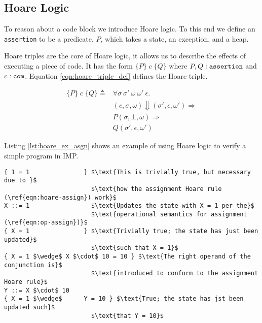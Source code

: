 
\subsection{Hoare Logic}
To reason about a code block we introduce Hoare logic. To this end we define an \verb|assertion| to be a predicate, $P$, which takes a state, an exception, and a heap.

Hoare triples are the core of Hoare logic, it allows us to describe the effects of executing a piece of code. It has the form $\{P\}\;c\;\{Q\}$ where $P,Q : \verb|assertion|$ and $c : \verb|com|$.
Equation \ref{eqn:hoare_triple_def} defines the Hoare triple.

\begin{equation}\label{eqn:hoare_triple_def}
\begin{alignedat}{1}
\{P\}\;c\;\{Q\} \triangleq &\forall \sigma \: \sigma' \: \omega \: \omega' \: \epsilon .\\
& (c,\sigma,\omega) \Downarrow (\sigma', \epsilon, \omega') \Rightarrow\\
& P(\sigma,\bot,\omega) \Rightarrow\\
& Q(\sigma',\epsilon,\omega')
\end{alignedat}
\end{equation}

Listing \ref{lst:hoare_ex_asgn} shows an example of using Hoare logic to verify a simple program in IMP.

\begin{lstlisting}[mathescape=true,keepspaces=true,label=lst:hoare_ex_asgn,caption=A simple code block proven using Hoare triples.]
{ 1 = 1               } $\text{This is trivially true, but necessary due to }$
                        $\text{how the assignment Hoare rule (\ref{eqn:hoare-assign}) work}$
X ::= 1                 $\text{Updates the state with X = 1 per the}$
                        $\text{operational semantics for assignment (\ref{eqn:op-assign})}$
{ X = 1               } $\text{Trivially true; the state has just been updated}$
                        $\text{such that X = 1}$
{ X = 1 $\wedge$ X $\cdot$ 10 = 10 } $\text{The right operand of the conjunction is}$
                        $\text{introduced to conform to the assignment Hoare rule}$
Y ::= X $\cdot$ 10
{ X = 1 $\wedge$      Y = 10 } $\text{True; the state has jst been updated such}$
                        $\text{that Y = 10}$
\end{lstlisting}

